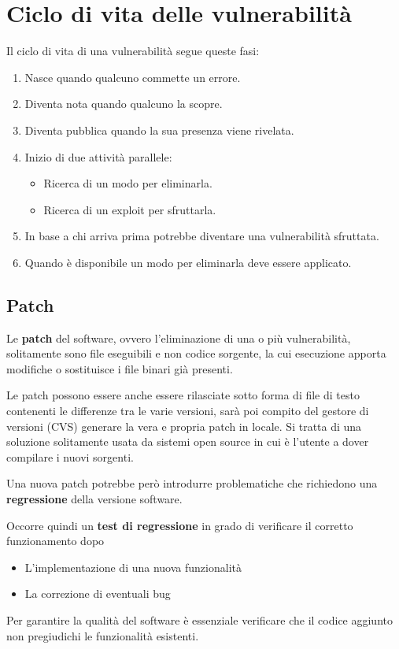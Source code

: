 \section{Ciclo di vita delle vulnerabilità}
Il ciclo di vita di una vulnerabilità segue queste fasi:
\begin{enumerate}
	\item Nasce quando qualcuno commette un errore.
	\item Diventa nota quando qualcuno la scopre.
	\item Diventa pubblica quando la sua presenza viene rivelata.
	\item Inizio di due attività parallele:
	      \begin{itemize}
		      \item Ricerca di un modo per eliminarla.
		      \item Ricerca di un exploit per sfruttarla.
	      \end{itemize}
	\item In base a chi arriva prima potrebbe diventare una vulnerabilità sfruttata.
	\item Quando è disponibile un modo per eliminarla deve essere applicato.
\end{enumerate}

\subsection{Patch}
Le \textbf{patch} del software, ovvero l'eliminazione di una o più vulnerabilità, solitamente sono file eseguibili e
non codice sorgente, la cui esecuzione apporta modifiche o sostituisce i file binari già presenti.

Le patch possono essere anche essere rilasciate sotto forma di file di testo contenenti le differenze tra le varie
versioni, sarà poi compito del gestore di versioni (CVS) generare la vera e propria patch in locale. Si tratta di una
soluzione solitamente usata da sistemi open source in cui è l'utente a dover compilare i nuovi sorgenti.

Una nuova patch potrebbe però introdurre problematiche che richiedono una \textbf{regressione} della versione software.

Occorre quindi un \textbf{test di regressione} in grado di verificare il corretto funzionamento dopo
\begin{itemize}
	\item L'implementazione di una nuova funzionalità
	\item La correzione di eventuali bug
\end{itemize}
Per garantire la qualità del software è essenziale verificare che il codice aggiunto non pregiudichi le funzionalità
esistenti.

